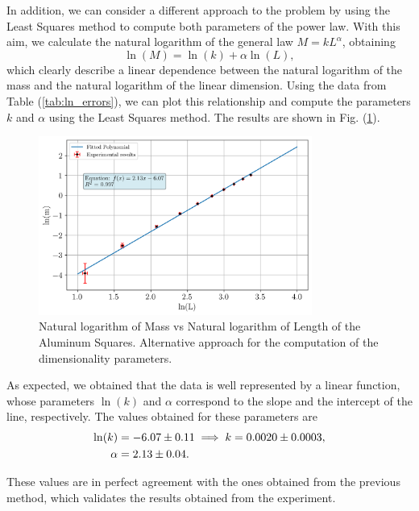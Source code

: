 \documentclass[a4paper,12pt]{article}
\begin{document}
In addition, we can consider a different approach to the problem by using the Least Squares method to compute both parameters of the power law. With this aim, we calculate 
the natural logarithm of the general law $M = k L^{\alpha}$, obtaining 
\begin{equation}
    \ln(M) = \ln(k) + \alpha \ln(L),
\end{equation}
which clearly describe a linear dependence between the natural logarithm of the mass and the natural logarithm of the linear dimension. Using the data from Table (\ref{tab:ln_errors}), we can plot this relationship and compute the parameters $k$ and $\alpha$ using the Least Squares method. The results are shown in Fig. (\ref{fig:ln_mass_vs_ln_length}).
\begin{figure}[h!]
    \centering
    \includegraphics[width = 0.8\textwidth]{ln_mass_vs_ln_length.png}
    \caption{Natural logarithm of Mass vs Natural logarithm of Length of the Aluminum Squares. Alternative approach for the computation of the dimensionality parameters.}
    \label{fig:ln_mass_vs_ln_length}
\end{figure}

As expected, we obtained that the data is well represented by a linear function, whose parameters $\ln(k)$ and $\alpha$ correspond to the slope and the intercept of the line, respectively. 
The values obtained for these parameters are 
\begin{align}
    \ln(k) &= -6.07 \pm 0.11 \implies k = 0.0020 \pm 0.0003,\\ \notag
    \alpha &= 2.13 \pm  0.04.
\end{align}

These values are in perfect agreement with the ones obtained from the previous method, which validates the results obtained from the experiment.
\end{document}
